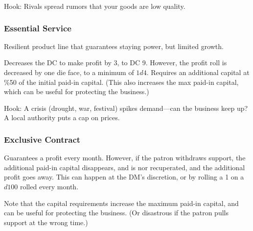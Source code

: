\documentclass[twocolumn]{dndbook}
\begin{document}
Hook: Rivals spread rumors that your goods are low quality.\par


\subsubsection{Essential Service}

Resilient product line that guarantees staying power, but limited growth.\par

\begin{DndComment}[color=bgtan2018]{}
	Decreases the DC to make profit by 3, to DC 9.
	However, the profit roll is decreased by one die face, to a minimum of $1d4$.
	Requires an additional capital at \%50 of the initial paid-in capital.
	(This also increases the max paid-in capital, which can be useful for protecting the business.)
\end{DndComment}



Hook: A crisis (drought, war, festival) spikes demand—can the business keep up?
A local authority puts a cap on prices.\par

\subsubsection{Exclusive Contract}


Guarantees a profit every month. However, if the patron withdraws support,
the additional paid-in capital disappears, and is nor recuperated, and
the additional profit goes away. This can happen at the DM's discretion,
or by rolling a 1 on a $d100$ rolled every month.\par

Note that the capital requirements increase the maximum paid-in capital,
and can be useful for protecting the business.
(Or disastrous if the patron pulls support at the wrong time.)\par



\end{document}
